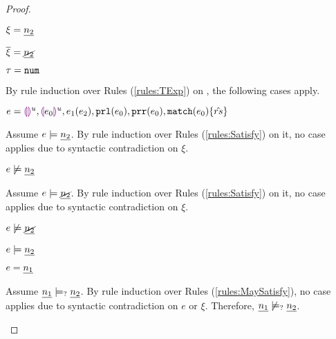 \begin{proof}
\begin{byCases}
\item[\text{(\ref{rule:CTNum})}]
    \begin{pfsteps*}
    \item $\xi=\underline{n_2}$ 
    \item $\overline{\xi}=\underline{\cancel{n_2}}$ 
    \item $\tau=\mathtt{num}$ 
    \end{pfsteps*}
    By rule induction over Rules (\ref{rules:TExp}) on , the following cases apply.
    \begin{byCases}
    \item[\text{(\ref{rule:TEHole}),(\ref{rule:THole}),(\ref{rule:TAp}),(\ref{rule:TPrl}),(\ref{rule:TPrr}),(\ref{rule:TMatchZPre}),(\ref{rule:TMatchNZPre})}]
        \begin{pfsteps*}
        \item $e=\textcolor{violet}{\llparenthesis}\textcolor{violet}{\rrparenthesis}^{u},\textcolor{violet}{\llparenthesis} e_0\textcolor{violet}{\rrparenthesis}^{u},e_1(e_2),\mathtt{prl}(e_0),\mathtt{prr}(e_0),\mathtt{match}(e_0) \{\hat{rs}\}$ 
        \end{pfsteps*}
        Assume $e \models \underline{n_2}$. By rule induction over Rules (\ref{rules:Satisfy}) on it, no case applies due to syntactic contradiction on $\xi$.
        \begin{pfsteps*}
        \item $e \not\models \underline{n_2}$  
        \end{pfsteps*}
        Assume $e \models \underline{\cancel{n_2}}$. By rule induction over Rules (\ref{rules:Satisfy}) on it, no case applies due to syntactic contradiction on $\xi$.
        \begin{pfsteps*}
        \item $e \not\models \underline{\cancel{n_2}}$  
        \item $e \models \underline{n_2}$ 
        \end{pfsteps*}
    \item[\text{(\ref{rule:TNum})}]
        \begin{pfsteps*}
        \item $e=\underline{n_1}$ 
        \end{pfsteps*}
        Assume $\underline{n_1} \models_{?} \underline{n_2}$. By rule induction over Rules (\ref{rules:MaySatisfy}), no case applies due to syntactic contradiction on $e$ or $\xi$.
        Therefore, $\underline{n_1} \not\models_{?} \underline{n_2}$.
        

\end{byCases}
\end{byCases}
\end{proof}
